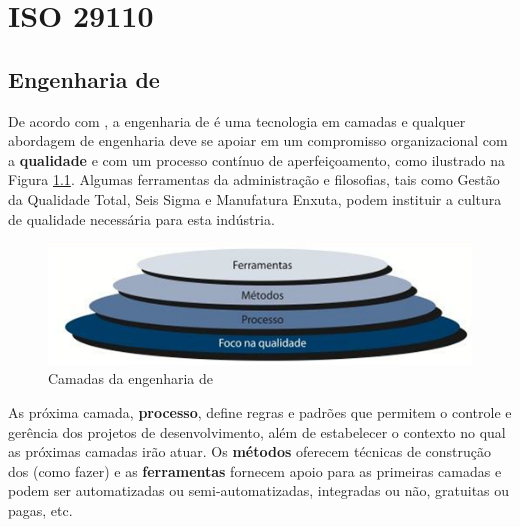 
\chapter{ISO 29110}

\section{Engenharia de \sw}

De acordo com \cite{pressman}, a engenharia de \sw é uma tecnologia em camadas e qualquer abordagem de engenharia deve se apoiar em um compromisso organizacional com a \textbf{qualidade} e com um processo contínuo de aperfeiçoamento, como ilustrado na Figura \ref{fig:sw.camadas}. Algumas ferramentas da administração e filosofias, tais como Gestão da Qualidade Total\footnotemark {}, Seis Sigma\footnotemark {} e Manufatura Enxuta\footnotemark, podem instituir a cultura de qualidade necessária para esta indústria.


\begin{figure}[!h]
\centering
\includegraphics[scale=1]{figuras/eng_sw_camadas.png}
\caption{Camadas da engenharia de \sw \citep[p.17]{pressman}}
\label{fig:sw.camadas}
\end{figure}

As próxima camada, \textbf{processo}, define regras e padrões que permitem o controle e gerência dos projetos de desenvolvimento, além de estabelecer o contexto no qual as próximas camadas irão atuar. Os \textbf{métodos} oferecem técnicas de construção dos \sws (como fazer) e as \textbf{ferramentas} fornecem apoio para as primeiras camadas e podem ser automatizadas ou semi-automatizadas, integradas ou não, gratuitas ou pagas, etc.

